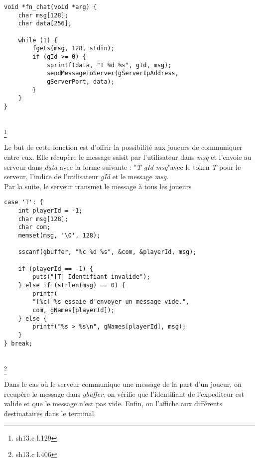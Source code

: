 \documentclass[11pt]{article}
\newenvironment{DDbox}[1]{
\begin{lrbox}{\BBbox}\begin{minipage}{\linewidth}}
{\end{minipage}\end{lrbox}\noindent\colorbox{Zgris}{\usebox{\BBbox}} \\
[.5cm]}
\begin{document}
\begin{DDbox}{\linewidth}
\begin{Verbatim}
void *fn_chat(void *arg) {
	char msg[128];
	char data[256];

	while (1) {
		fgets(msg, 128, stdin);
		if (gId >= 0) {
			sprintf(data, "T %d %s", gId, msg);
			sendMessageToServer(gServerIpAddress,
			gServerPort, data); 
		}
	}
}
\end{Verbatim}
\end{DDbox}
\footnote{sh13.c l.129}

Le but de cette fonction est d'offrir la possibilité aux joueurs de communiquer entre eux. Elle récupère le message saisit par l'utilisateur dans \emph{msg} et l'envoie au serveur dans \emph{data} avec la forme suivante : "\emph{T gId msg}"avec le token \emph{T} pour le serveur, l'indice de l'utilisateur \emph{gId} et le message \emph{msg}.\\

Par la suite, le serveur transmet le message à tous les joueurs

\begin{DDbox}{\linewidth}
\begin{Verbatim}
case 'T': {
	int playerId = -1;
	char msg[128];
	char com;
	memset(msg, '\0', 128);

	sscanf(gbuffer, "%c %d %s", &com, &playerId, msg);

	if (playerId == -1) {
		puts("[T] Identifiant invalide");
	} else if (strlen(msg) == 0) {
		printf(
		"[%c] %s essaie d'envoyer un message vide.",
		com, gNames[playerId]);
	} else {
		printf("%s > %s\n", gNames[playerId], msg);
	}
} break;
\end{Verbatim}
\end{DDbox}
\footnote{sh13.c l.406}

Dans le cas où le serveur communique une message de la part d'un joueur, on recupère le message dans \emph{gbuffer}, on vérifie que l'identifiant de l'expediteur est valide et que le message n'est pas vide. Enfin, on l'affiche aux différents destinataires dans le terminal.
\end{document}
